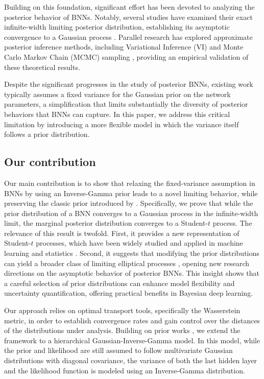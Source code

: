 \documentclass[a4paper, 11pt, reqno]{amsart}
\newcommand{\citet}[2][]{\citeauthor{#2} \cite[#1]{#2}}
\newcommand{\citep}[2][]{\cite[#1]{#2}}
\theoremstyle{plain}
\theoremstyle{remark}
\theoremstyle{definition}
\begin{document}
Building on this foundation, significant effort has been devoted to analyzing the posterior behavior of BNNs. Notably, several studies have examined their exact infinite-width limiting posterior distribution, establishing its asymptotic convergence to a Gaussian process \citep{hron2020,trevisan2023}. Parallel research has explored approximate posterior inference methods, including Variational Inference (VI) \citep{blundell2015} and Monte Carlo Markov Chain (MCMC) sampling \citep{izmailov2021,pezzetti2024}, providing an empirical validation of these theoretical results.

Despite the significant progresses in the study of posterior BNNs, existing work typically assumes a fixed variance for the Gaussian prior on the network parameters, a simplification that limits substantially the diversity of posterior behaviors that BNNs can capture. In this paper, we address this critical  limitation by introducing a more flexible model in which the variance itself follows a prior distribution.

\subsection{Our contribution}

Our main contribution is to show that relaxing the fixed-variance assumption in BNNs by using an Inverse-Gamma prior leads to a novel limiting behavior, while preserving the classic prior introduced by \citet{neal1996}. 
Specifically, we prove that while the prior distribution of a BNN converges to a Gaussian process in the infinite-width limit, the marginal posterior distribution converges to a Student-$t$ process. 
The relevance of this result is twofold. First, it provides a new representation of Student-$t$ processes, which have been widely studied and applied in machine learning and statistics \citep{shah2014,tracey2018,sellier2023}. 
Second, it suggests that modifying the prior distributions can yield a broader class of limiting elliptical processes \citep{fang1989,bankestad2020}, opening new research directions on the asymptotic behavior of posterior BNNs. 
This insight shows that a careful selection of prior distributions can enhance model flexibility and uncertainty quantification, offering practical benefits in Bayesian deep learning.

Our approach relies on optimal transport tools, specifically the Wasserstein metric, in order to establish convergence rates and gain control over the distances of the distributions under analysis. Building on prior works \citep{basteri2022,trevisan2023}, we extend the framework to a hierarchical Gaussian-Inverse-Gamma model. In this model, while the prior and likelihood are still assumed to follow multivariate Gaussian distributions with diagonal covariance, the variance of both the last hidden layer and the likelihood function is modeled using an Inverse-Gamma distribution.
\end{document}
